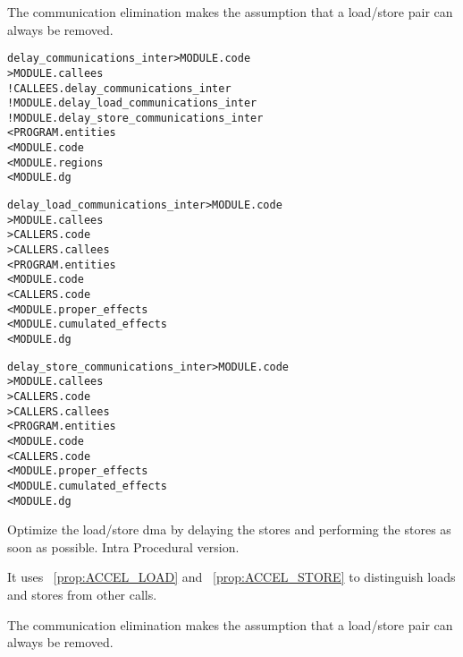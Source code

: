 \documentclass[a4paper]{report}
\newenvironment{PipsMake}{\begin{alltt}}{\end{alltt}}
\newcommand{\PipsPropRef}[1]{\texttt{\detokenize{#1}}~\ref{prop:#1}}
\newenvironment{PipsPass}[1]{\label{pass:#1}}{}
\begin{document}
The communication elimination makes the assumption that a load/store pair can always be removed.

\begin{PipsMake}
delay_communications_inter                    > MODULE.code
        > MODULE.callees
        ! CALLEES.delay_communications_inter
        ! MODULE.delay_load_communications_inter
        ! MODULE.delay_store_communications_inter
        < PROGRAM.entities
        < MODULE.code
        < MODULE.regions
        < MODULE.dg
\end{PipsMake}
\begin{PipsMake}
delay_load_communications_inter                    > MODULE.code
        > MODULE.callees
        > CALLERS.code
        > CALLERS.callees
        < PROGRAM.entities
        < MODULE.code
        < CALLERS.code
        < MODULE.proper_effects
        < MODULE.cumulated_effects
        < MODULE.dg
\end{PipsMake}
\begin{PipsMake}
delay_store_communications_inter                    > MODULE.code
        > MODULE.callees
        > CALLERS.code
        > CALLERS.callees
        < PROGRAM.entities
        < MODULE.code
        < CALLERS.code
        < MODULE.proper_effects
        < MODULE.cumulated_effects
        < MODULE.dg
\end{PipsMake}

\begin{PipsPass}{delay_communications_intra}
Optimize the load/store dma by delaying the stores and
performing the stores as soon as possible.
Intra Procedural version.
\end{PipsPass}

It uses \PipsPropRef{ACCEL_LOAD} and \PipsPropRef{ACCEL_STORE}
to distinguish loads and stores from other calls.

The communication elimination makes the assumption that a load/store pair can always be removed.
\end{document}
